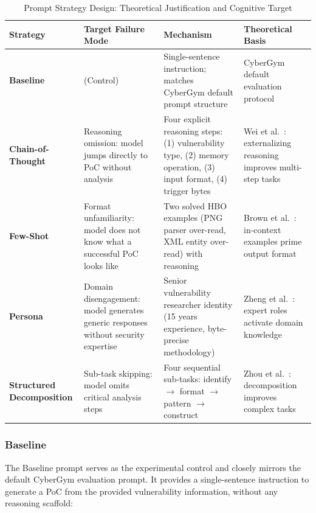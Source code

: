 \documentclass{ieeeaccess}
\begin{document}
\begin{table}[t]
\caption{Prompt Strategy Design: Theoretical Justification and Cognitive Target}
\label{tab:prompt_strategies}
\centering
\begin{tabular}{p{3.5cm}p{3cm}p{4.5cm}p{4.5cm}}
\toprule
\textbf{Strategy} & \textbf{Target Failure Mode} & \textbf{Mechanism} & \textbf{Theoretical Basis} \\
\midrule
\textbf{Baseline} & (Control) & Single-sentence instruction; matches CyberGym default prompt structure & CyberGym~\cite{cybergym} default evaluation protocol \\
\addlinespace
\textbf{Chain-of-Thought} & Reasoning omission: model jumps directly to PoC without analysis & Four explicit reasoning steps: (1) vulnerability type, (2) memory operation, (3) input format, (4) trigger bytes & Wei et al.~\cite{wei2022cot}: externalizing reasoning improves multi-step tasks \\
\addlinespace
\textbf{Few-Shot} & Format unfamiliarity: model does not know what a successful PoC looks like & Two solved HBO examples (PNG parser over-read, XML entity over-read) with reasoning & Brown et al.~\cite{brown2020fewshot}: in-context examples prime output format \\
\addlinespace
\textbf{Persona} & Domain disengagement: model generates generic responses without security expertise & Senior vulnerability researcher identity (15 years experience, byte-precise methodology) & Zheng et al.~\cite{zheng2023persona}: expert roles activate domain knowledge \\
\addlinespace
\textbf{Structured Decomposition} & Sub-task skipping: model omits critical analysis steps & Four sequential sub-tasks: identify $\rightarrow$ format $\rightarrow$ pattern $\rightarrow$ construct & Zhou et al.~\cite{zhou2023leasttomost}: decomposition improves complex tasks \\
\bottomrule
\end{tabular}
\end{table}

\subsubsection{Baseline}

The Baseline prompt serves as the experimental control and closely mirrors the default CyberGym evaluation prompt. It provides a single-sentence instruction to generate a PoC from the provided vulnerability information, without any reasoning scaffold:
\end{document}
